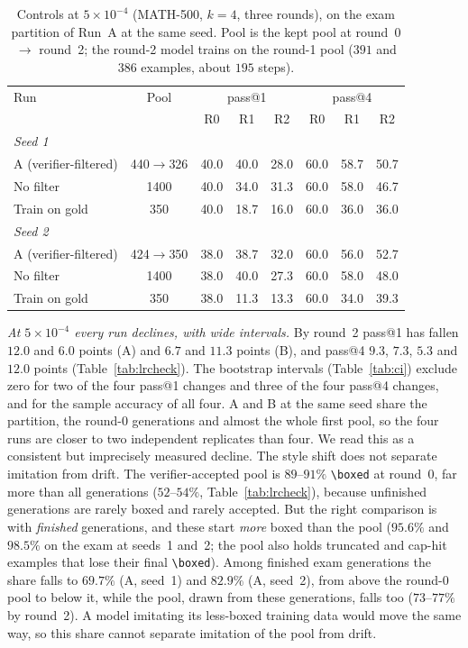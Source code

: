 \documentclass[runningheads]{llncs}
\begin{document}
\begin{table}[!htb]
\caption{Controls at $5\times10^{-4}$ (MATH-500, $k=4$, three rounds), on the
exam partition of Run~A at the same seed. Pool is the kept pool at round~0 $\to$ round~2; the round-2 model trains on the
round-1 pool ($391$ and $386$ examples, about $195$ steps).}
\label{tab:controls}
\centering
\setlength{\tabcolsep}{5pt}
\begin{tabular}{lccccccc}
\toprule
Run & Pool & \multicolumn{3}{c}{pass@1} & \multicolumn{3}{c}{pass@4} \\
 &  & R0 & R1 & R2 & R0 & R1 & R2 \\
\midrule
\multicolumn{8}{l}{\emph{Seed 1}} \\
A (verifier-filtered) & 440$\to$326 & 40.0 & 40.0 & 28.0 & 60.0 & 58.7 & 50.7 \\
No filter             & 1400 & 40.0 & 34.0 & 31.3 & 60.0 & 58.0 & 46.7 \\
Train on gold         & 350 & 40.0 & 18.7 & 16.0 & 60.0 & 36.0 & 36.0 \\
\midrule
\multicolumn{8}{l}{\emph{Seed 2}} \\
A (verifier-filtered) & 424$\to$350 & 38.0 & 38.7 & 32.0 & 60.0 & 56.0 & 52.7 \\
No filter             & 1400 & 38.0 & 40.0 & 27.3 & 60.0 & 58.0 & 48.0 \\
Train on gold         & 350 & 38.0 & 11.3 & 13.3 & 60.0 & 34.0 & 39.3 \\
\bottomrule
\end{tabular}
\end{table}

\emph{At $5\times10^{-4}$ every run declines, with wide intervals.} By round~2
pass@1 has fallen $12.0$ and $6.0$ points (A) and $6.7$ and $11.3$ points (B), and
pass@4 $9.3$, $7.3$, $5.3$ and $12.0$ points (Table~\ref{tab:lrcheck}). The
bootstrap intervals (Table~\ref{tab:ci}) exclude zero for two of the four
pass@1 changes and three of the four pass@4 changes, and for the sample
accuracy of all four. A and B at the same seed share the partition, the round-0
generations and almost the whole first pool, so the four runs are closer to two
independent replicates than four. We read this as a consistent but imprecisely
measured decline. The style shift does not separate imitation from drift. The
verifier-accepted pool is $89$--$91\%$ \verb|\boxed| at round~0, far more than
all generations ($52$--$54\%$, Table~\ref{tab:lrcheck}), because unfinished
generations are rarely boxed and rarely accepted. But the right comparison is
with \emph{finished} generations, and these start \emph{more} boxed than the
pool ($95.6\%$ and $98.5\%$ on the exam at seeds~1 and~2; the pool also holds
truncated and cap-hit examples that lose their final \verb|\boxed|). Among
finished exam generations the share falls to $69.7\%$ (A, seed~1) and $82.9\%$
(A, seed~2), from above the round-0 pool to below it, while the pool, drawn
from these generations, falls too ($73$--$77\%$ by round~2). A model imitating
its less-boxed training data would move the same way, so this share cannot
separate imitation of the pool from drift.
\end{document}
